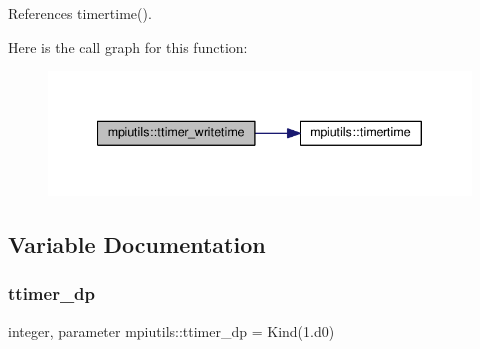 References timertime().

Here is the call graph for this function\+:
\nopagebreak
\begin{figure}[H]
\begin{center}
\leavevmode
\includegraphics[width=340pt]{namespacempiutils_aec296fa19d748cab235ef01a63cdc289_cgraph}
\end{center}
\end{figure}


\subsection{Variable Documentation}
\mbox{\label{namespacempiutils_a29264c4652e8287096a27ca2675edc26}} 
\subsubsection{\texorpdfstring{ttimer\+\_\+dp}{ttimer\_dp}}
{\footnotesize\ttfamily integer, parameter mpiutils\+::ttimer\+\_\+dp = Kind(1.d0)}

